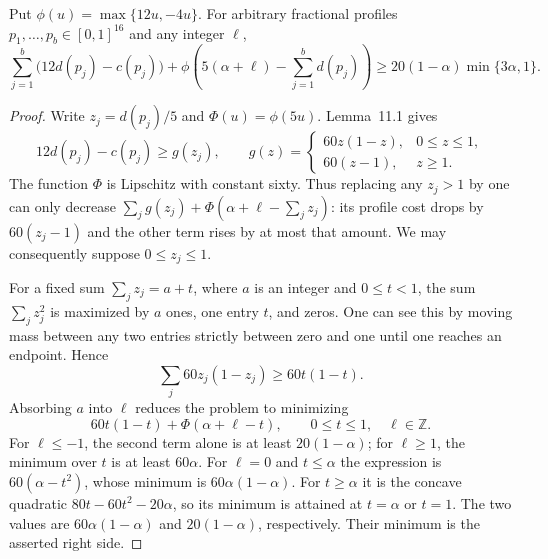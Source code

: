 \begin{lemma}\label{lem:scalar-profile}
Put $\phi(u)=\max\{12u,-4u\}$. For arbitrary fractional profiles
$p_1,\ldots,p_b\in[0,1]^{16}$ and any integer $\ell$,
\begin{equation}\tag{58}\label{eq:scalar-profile}
 \sum_{j=1}^b\bigl(12d(p_j)-c(p_j)\bigr)
 +\phi\left(5(\alpha+\ell)-\sum_{j=1}^bd(p_j)\right)
 \geq20(1-\alpha)\min\{3\alpha,1\}.
\end{equation}
\end{lemma}
\begin{proof}
Write $z_j=d(p_j)/5$ and $\Phi(u)=\phi(5u)$. Lemma~11.1 gives
\[
 12d(p_j)-c(p_j)\geq g(z_j),\qquad
 g(z)=\begin{cases}
       60z(1-z),&0\leq z\leq1,\\
       60(z-1),&z\geq1.
      \end{cases}
\]
The function $\Phi$ is Lipschitz with constant sixty. Thus replacing any
$z_j>1$ by one can only decrease
$\sum_jg(z_j)+\Phi(\alpha+\ell-\sum_jz_j)$: its profile cost drops by
$60(z_j-1)$ and the other term rises by at most that amount. We may
consequently suppose $0\leq z_j\leq1$.

For a fixed sum $\sum_jz_j=a+t$, where $a$ is an integer and $0\leq t<1$,
the sum $\sum_jz_j^2$ is maximized by $a$ ones, one entry $t$, and zeros.
One can see this by moving mass between any two entries strictly between
zero and one until one reaches an endpoint. Hence
\[
 \sum_j60z_j(1-z_j)\geq60t(1-t).
\]
Absorbing $a$ into $\ell$ reduces the problem to minimizing
\[
 60t(1-t)+\Phi(\alpha+\ell-t),\qquad 0\leq t\leq1,\quad\ell\in\mathbb Z.
\]
For $\ell\leq-1$, the second term alone is at least $20(1-\alpha)$; for
$\ell\geq1$, the minimum over $t$ is at least $60\alpha$. For $\ell=0$
and $t\leq\alpha$ the expression is $60(\alpha-t^2)$, whose minimum is
$60\alpha(1-\alpha)$. For $t\geq\alpha$ it is the concave quadratic
$80t-60t^2-20\alpha$, so its minimum is attained at $t=\alpha$ or $t=1$.
The two values are $60\alpha(1-\alpha)$ and $20(1-\alpha)$, respectively.
Their minimum is the asserted right side.
\end{proof}

